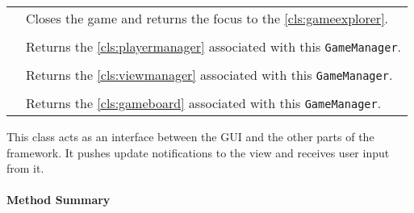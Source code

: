 \begin{longtable}{Lp{10cm}}
	& Closes the game and returns the focus to the \ref{cls:gameexplorer}. \\
	 \\
	& Returns the \ref{cls:playermanager} associated with this \texttt{GameManager}.\\
	 \\
	& Returns the \ref{cls:viewmanager} associated with this \texttt{GameManager}.\\
	 \\
	& Returns the \ref{cls:gameboard} associated with this \texttt{GameManager}.\\
	\hline
\end{longtable}

\pagebreak

This class acts as an interface between the \gls{GUI} and the other parts of the \gls{framework}. It pushes update notifications to the view and receives user input from it. \\

\centerdash

\paragraph*{Method Summary}
